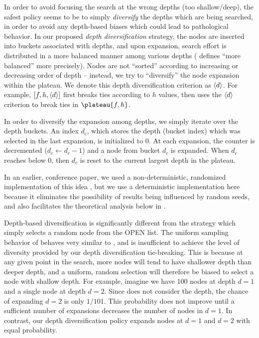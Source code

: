 In order to avoid focusing the search at the wrong depths (too shallow/deep), 
the safest policy seems to be to simply \emph{diversify} the depths which are being searched,
in order to avoid any depth-based biases which could lead to pathological behavior.
In our proposed \emph{depth diversification} strategy, the nodes are inserted into buckets
associated with depths, and upon expansion, search effort is distributed in a more balanced manner
among various depths ( defines ``more balanced''  more precisely).
Nodes are not  ``sorted''
according to increasing or decreasing order of depth -- instead, we try to 
``diversify'' the node expansion within the plateau.
We denote this depth diversification criterion as ${\left<d\right>}$. 
For example, $[f,h,{\left<d\right>}]$ first breaks ties according to $h$ values,
then uses the ${\left<d\right>}$ criterion to break ties in $\plateau{f,h}$.

In order to diversify the expansion among depths, we simply
iterate over the depth buckets. An index $d_c$,
 which stores the depth (bucket index)  which was selected in the last expansion,
is initialized to 0.
At each expansion, the counter is decremented ($d_c\leftarrow d_c-1$) and
a node from  bucket $d_c$ is expanded. When $d_c$ reaches below 0, then $d_c$
is reset to the current largest depth in the plateau.

In an earlier, conference paper, we used a non-deterministic,
randomized implementation of this idea \cite{Asai2016}, but we use a deterministic
implementation here because it eliminates the possibility of results being influenced by random seeds,
and also facilitates the  theoretical analysis below in .

Depth-based diversification is significantly different from \ro the strategy which simply selects a random node from the OPEN list.
The uniform sampling behavior of  \ro behaves very similar to \fifo, and is insufficient to achieve the level of diversity provided by our depth diversification tie-breaking.
This is because at any given point in the search, more nodes will tend to have shallower depth than deeper depth, and a uniform, random selection will therefore be biased to select a node with shallow depth.
For example, imagine we have 100 nodes at depth $d=1$ and a single node at depth $d=2$.
Since \ro does not consider the depth, the chance of expanding $d=2$ is only $1/101$.
This probability does not improve until a sufficient number of expansions decreases the number of nodes in $d=1$.
In contrast, our depth diversification policy expands nodes at $d=1$ and $d=2$ with equal probability.


